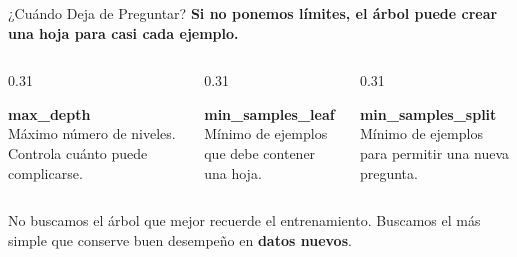 \documentclass[aspectratio=169, 11pt]{beamer}
\begin{document}
\begin{frame}{¿Cuándo Deja de Preguntar?}
  \vspace{-6pt}
  {\small\color{arcaDark}\bfseries
    Si no ponemos límites, el árbol puede crear una hoja para casi cada ejemplo.}

  \vspace{6pt}
  \begin{columns}[T]
    \begin{column}{0.31\textwidth}
      \begin{tcolorbox}[colback=arcaGray,colframe=arcaRed,boxrule=0pt,leftrule=3pt,arc=3pt]
        {\scriptsize\bfseries\color{arcaRed}max\_depth}\\[4pt]
        {\scriptsize\color{textMuted}Máximo número de niveles. Controla cuánto puede complicarse.}
      \end{tcolorbox}
    \end{column}
    \begin{column}{0.31\textwidth}
      \begin{tcolorbox}[colback=arcaGray,colframe=codeBlue,boxrule=0pt,leftrule=3pt,arc=3pt]
        {\scriptsize\bfseries\color{codeBlue}min\_samples\_leaf}\\[4pt]
        {\scriptsize\color{textMuted}Mínimo de ejemplos que debe contener una hoja.}
      \end{tcolorbox}
    \end{column}
    \begin{column}{0.31\textwidth}
      \begin{tcolorbox}[colback=arcaGray,colframe=codeGreen,boxrule=0pt,leftrule=3pt,arc=3pt]
        {\scriptsize\bfseries\color{codeGreen}min\_samples\_split}\\[4pt]
        {\scriptsize\color{textMuted}Mínimo de ejemplos para permitir una nueva pregunta.}
      \end{tcolorbox}
    \end{column}
  \end{columns}
  \vspace{10pt}
  {\footnotesize\color{textMuted}
    No buscamos el árbol que mejor recuerde el entrenamiento. Buscamos el más simple
    que conserve buen desempeño en \textbf{datos nuevos}.}
\end{frame}
\end{document}
